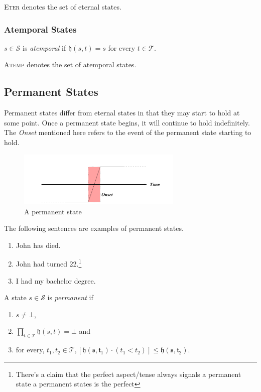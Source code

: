 \textsc{Eter} denotes the set of eternal states.

\subsubsection{Atemporal States}
\begin{defn}
  $s \in \mathcal{S}$ is \textit{atemporal} if $\mathfrak{h}(s, t) = s$ for every $t \in \mathcal{T}$.
\end{defn}
\textsc{Atemp} denotes the set of atemporal states.
\subsection{Permanent States}
Permanent states differ from eternal states in that they may start to hold at some point.
Once a permanent state begins, it will continue to hold indefinitely. The \textit{Onset} mentioned here refers to the event of the permanent state starting to hold.


\begin{figure}[H]
  \centering
  \includegraphics[width=0.7\textwidth]{images/permanent-states.png}
  \caption{A permanent state}
  \label{fig:permanent}
\end{figure}

The following sentences are examples of permanent states.


\begin{enumerate}
  \item John has died.
  \item John had turned 22.\footnote{There's a claim that the perfect aspect/tense always signals a permanent state a permanent states is the perfect}
  \item I had my bachelor degree.
\end{enumerate}

\begin{defn}
  A state $s \in \mathcal{S}$ is \textit{permanent} if
  \begin{enumerate}
    \item $s \neq \bot$,
    \item $\displaystyle \prod_{t \in \mathcal{T}} \mathfrak{h}(s, t) = \bot$ and
    \item for every, $t_1, t_2 \in \mathcal{T}, [\mathfrak{h(s, t_1)} \cdot (t_1 < t_2)] \leq \mathfrak{h(s, t_2)}$.
  \end{enumerate}
\end{defn}

